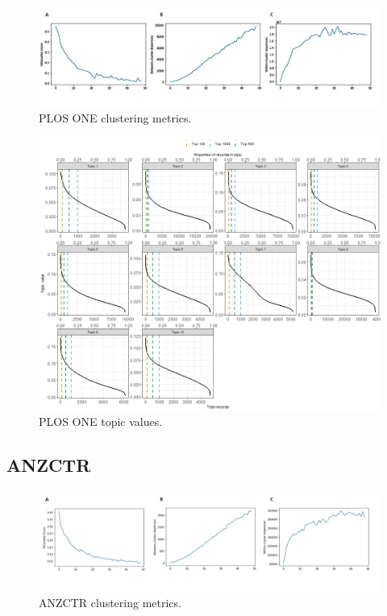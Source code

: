 \documentclass[12pt]{article}
\begin{document}
\begin{figure}

{\centering \includegraphics[width=1\linewidth]{figures/supplementary/supp_plosone.50clusters} 

}

\caption{PLOS ONE clustering metrics.}\label{fig:unnamed-chunk-10}
\end{figure}

\begin{figure}

{\centering \includegraphics[width=1\linewidth]{figures/supplementary/plos.topicvalues} 

}

\caption{PLOS ONE topic values.}\label{fig:unnamed-chunk-11}
\end{figure}

\subsection{ANZCTR}

\begin{figure}

{\centering \includegraphics[width=1\linewidth]{figures/supplementary/supp_anzctr.50clusters} 

}

\caption{ANZCTR clustering metrics.}\label{fig:unnamed-chunk-12}
\end{figure}
\end{document}
